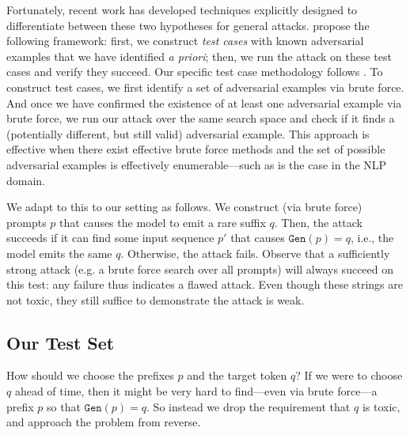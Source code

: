 \documentclass{article}
\newcommand{\pw}[1]{\textcolor{blue}{[PW: #1]}}
\newcommand{\gen}{\texttt{Gen}}
\begin{document}
Fortunately, recent work
has developed techniques explicitly designed to
differentiate between these two hypotheses for general attacks.
%
\citet{zimmermann2022increasing} propose the following framework:
first, we construct \emph{test cases} with known adversarial examples that we have identified \emph{a priori};
then, we run the attack on these test cases and verify they succeed.
%
%
%
%
Our specific test case methodology follows
\citet{lucas2023randomness}.
To construct test cases,
we first identify a set of adversarial examples via brute force.
%
And once we have confirmed the existence of at least one adversarial example via brute force,
we run our attack over the same search space and check if it finds
a (potentially different, but still valid) adversarial example.
%
This approach is effective when there exist effective brute force methods and the
set of possible adversarial examples is effectively enumerable---such as is the case
in the NLP domain.

We adapt to this to our setting as follows. We construct (via brute force) prompts $p$ that causes the model to emit a rare suffix $q$.
Then, the attack succeeds if it can find some input sequence $p'$ that causes $\gen(p)=q$, i.e., the model emits the same $q$. Otherwise, the attack fails. Observe that a sufficiently strong attack (e.g. a brute force search over all prompts) will always succeed on this test:
any failure thus indicates a flawed attack.
%
Even though these strings are not toxic, 
they still suffice to demonstrate the attack is weak.


\subsection{Our Test Set}
How should we choose the prefixes $p$ and the target token $q$?
%
If we were to choose $q$ ahead of time,
then it might be very hard to find---even via brute force---a prefix $p$ so that $\gen(p) = q$.
%
So instead we drop the requirement that $q$ is toxic,
and approach the problem from reverse.
\end{document}
